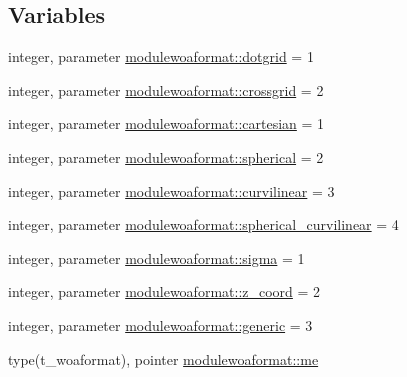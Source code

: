 \subsection*{Variables}
\begin{DoxyCompactItemize}
\item 
integer, parameter \mbox{\hyperlink{namespacemodulewoaformat_a70ceb806b6dbf5c8906fd09acbae0cba}{modulewoaformat\+::dotgrid}} = 1
\item 
integer, parameter \mbox{\hyperlink{namespacemodulewoaformat_a52d7e1d75349b1ff55f1e87ceeb9448d}{modulewoaformat\+::crossgrid}} = 2
\item 
integer, parameter \mbox{\hyperlink{namespacemodulewoaformat_af19bc667cadaffe97caf9561001439d5}{modulewoaformat\+::cartesian}} = 1
\item 
integer, parameter \mbox{\hyperlink{namespacemodulewoaformat_a019b0d25c27d95c27163eeccbe2f7faf}{modulewoaformat\+::spherical}} = 2
\item 
integer, parameter \mbox{\hyperlink{namespacemodulewoaformat_aa3bf5d769ef79cef59697177bcba35c4}{modulewoaformat\+::curvilinear}} = 3
\item 
integer, parameter \mbox{\hyperlink{namespacemodulewoaformat_aafcf1dec3bf62c485292e8e3bc9e76de}{modulewoaformat\+::spherical\+\_\+curvilinear}} = 4
\item 
integer, parameter \mbox{\hyperlink{namespacemodulewoaformat_ac9b1824fbce52f7e6f2d51388f7863f1}{modulewoaformat\+::sigma}} = 1
\item 
integer, parameter \mbox{\hyperlink{namespacemodulewoaformat_aecd16c0890bb293e0341eddde87f5025}{modulewoaformat\+::z\+\_\+coord}} = 2
\item 
integer, parameter \mbox{\hyperlink{namespacemodulewoaformat_a01662486998b5c372888306235b00073}{modulewoaformat\+::generic}} = 3
\item 
type(t\+\_\+woaformat), pointer \mbox{\hyperlink{namespacemodulewoaformat_aa749739ae74edf849539a045da8223e0}{modulewoaformat\+::me}}
\end{DoxyCompactItemize}
